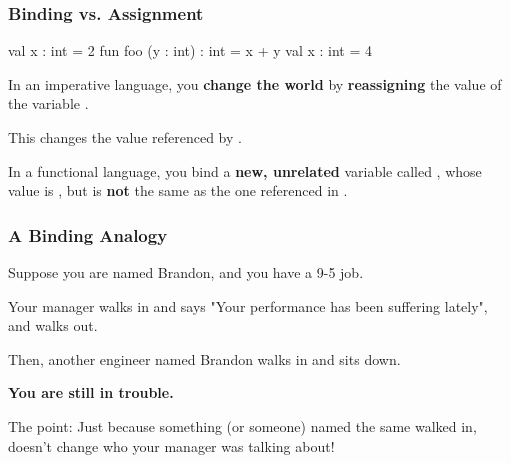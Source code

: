 \documentclass[aspectratio=169]{beamer}
\begin{document}
\begin{frame}[fragile]
  \frametitle{Binding vs. Assignment}

  \begin{codeblock}
    val x : int = 2 
    fun foo (y : int) : int = x + y
    val x : int = 4 
  \end{codeblock}

  \vspace{\fill}

  In an imperative language, you \textbf{change the world} by \textbf{reassigning} the 
  value of the variable .

  \vspace{5pt}

  This changes the value referenced by .

  \vspace{\fill}

  In a functional language, you bind a \textbf{new, unrelated} variable called ,
  whose value is , but is \textbf{not} the same as the one referenced in .

  \vspace{\fill}

\end{frame}

\begin{frame}[fragile]
  \frametitle{A Binding Analogy}

  Suppose you are named Brandon, and you have a 9-5 job. 

  \vspace{\fill}

  Your manager walks in and says "Your performance
  has been suffering lately", and walks out. 

  \vspace{\fill}

  Then, another engineer named Brandon walks in and sits down.

  \vspace{\fill}

  \textbf{You are still in trouble.}

  \vspace{\fill}

  The point: Just because something (or someone) named the same walked in, doesn't
  change who your manager was talking about!
\end{frame}
\end{document}
